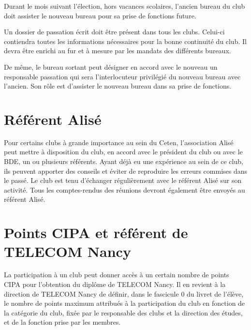 \documentclass{article}
\begin{document}
\begin{multicols}{2}
		{\small

			Durant le mois suivant l’élection, hors vacances scolaires, l’ancien
			bureau du club doit assister le nouveau bureau pour sa prise de
			fonctions future.

			Un dossier de passation écrit doit être présent dans tous les clubs.
			Celui-ci contiendra toutes les informations nécessaires pour la
			bonne continuité du club. Il devra être enrichi au fur et à mesure
			par les mandats des différents bureaux.

			De même, le bureau sortant peut désigner en accord avec le nouveau
			un responsable passation qui sera l’interlocuteur privilégié du
			nouveau bureau avec l’ancien. Son rôle est d’assister le nouveau
			bureau dans sa prise de fonctions.

		}

		\section{Référent Alisé}
\label{sec:referent_alise}

		{\small

			Pour certains clubs à grande importance au sein du Ceten,
			l’association Alisé peut mettre à disposition du club, en accord
			avec le président du club ou avec le BDE, un ou plusieurs référents.
			Ayant déjà eu une expérience au sein de ce club, ils peuvent
			apporter des conseils et éviter de reproduire les erreurs commises
			dans le passé. Le club est tenu d’échanger régulièrement avec le
			référent Alisé sur son activité. Tous les comptes-rendus des
			réunions devront également être envoyés au référent Alisé\@.

		}
		
		\section{Points CIPA et référent de TELECOM Nancy}
\label{sec:points_cipa_et_referent_de_telecom_nancy}

		{\small

			La participation à un club peut donner accès à un certain nombre de
			points CIPA pour l’obtention du diplôme de TELECOM Nancy. Il en
			revient à la direction de TELECOM Nancy de définir, dans le
			fascicule 0 du livret de l'élève, le nombre de points maximum
			attribués à la participation du club en fonction de la catégorie du
			club, fixée par le responsable des clubs et la direction des études,
			et de la fonction prise par les membres.

}
\end{multicols}
\end{document}
